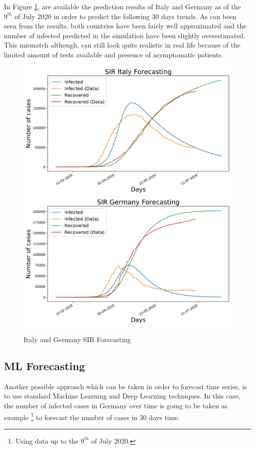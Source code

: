 In Figure \ref{sir_forecast}, are available the prediction results of Italy and Germany as of the $9^{th}$ of July 2020 in order to predict the following 30 days trends. As can been seen from the results, both countries have been fairly well approximated and the number of infected predicted in the simulation have been slightly overestimated. This mismatch although, can still look quite realistic in real life because of the limited amount of tests available and presence of asymptomatic patients.

\begin{figure}[ht!]%
    \centering
    \includegraphics[width=0.49\linewidth]{latex/images/Italy_preds.pdf}
    \includegraphics[width=0.49\linewidth]{latex/images/Germany_preds.pdf}
    \vspace{-0.2cm}
    \caption{Italy and Germany SIR Forecasting}
    \label{sir_forecast}
\end{figure}

\subsection{ML Forecasting}

Another possible approach which can be taken in order to forecast time series, is to use standard Machine Learning and Deep Learning techniques. In this case, the number of infected cases in Germany over time is going to be taken as example \footnote{Using data up to the $9^{th}$ of July 2020.} to forecast the number of cases in 30 days time. 


